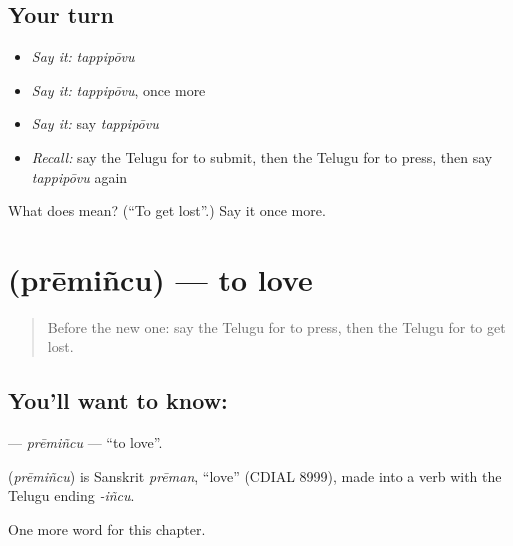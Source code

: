 \subsection*{Your turn}
\begin{itemize}
\raggedright
  \item \emph{Say it:} \emph{tappipōvu}
  \item \emph{Say it:} \emph{tappipōvu}, once more
  \item \emph{Say it:} say \emph{tappipōvu}
  \item \emph{Recall:} say the Telugu for to submit, then the Telugu for to press, then say \emph{tappipōvu} again
\end{itemize}

\begin{tcolorbox}[breakable,colback=teal!4,colframe=teal!35!black,title={Before you move on}]
What does  mean? (\textquotedblleft{}To get lost\textquotedblright{}.) Say it once more.
\end{tcolorbox}
\section[\texorpdfstring{\te{ప్రేమించు} (prēmiñcu)}{ప్రేమించు (prēmiñcu)}]{ (prēmiñcu) — to love}

\label{lesson:TE-C281-premincu}



\begin{quote}
Before the new one: say the Telugu for to press, then the Telugu for to get lost.
\end{quote}

\subsection*{You'll want to know: }
\textbf{} — \emph{prēmiñcu} — \textquotedblleft{}to love\textquotedblright{}.

\begin{cousinweb}
\textbf{} (\emph{prēmiñcu}) is Sanskrit \emph{prēman}, \textquotedblleft{}love\textquotedblright{} (CDIAL 8999), made into a verb with the Telugu ending \emph{-iñcu}.
\end{cousinweb}

\begin{grammarlens}[title={What you've built}]
One more word for this chapter.
\end{grammarlens}

